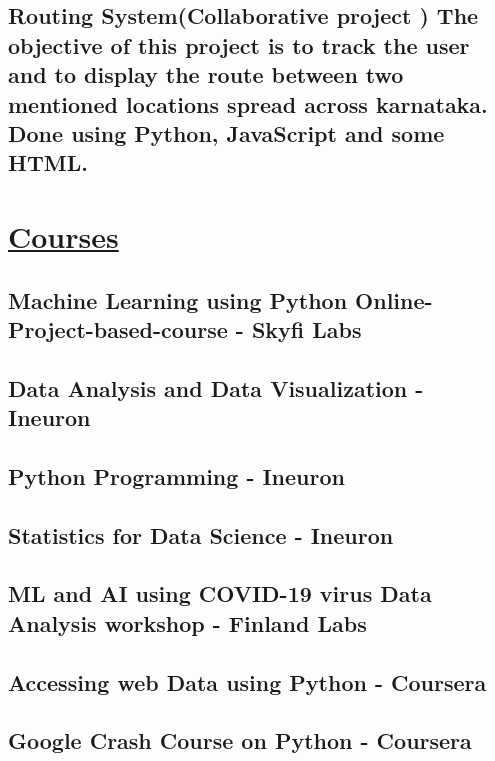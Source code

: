 \documentclass{article}
\begin{document}
    \subsection{\textbf{Routing System(Collaborative project )}
    \textmd{The objective of this project is to track the user and to display the route between two mentioned locations spread across karnataka. Done using Python, JavaScript and some HTML. } 
    }
\section{\underline{Courses}}


    \subsection{\textbf{Machine Learning using Python Online-Project-based-course }
    \textmd{- Skyfi Labs}}

    \subsection{\textbf{Data Analysis and Data Visualization}
    \textmd{- Ineuron}}

    \subsection{\textbf{Python Programming}
    \textmd{- Ineuron}}
    
    \subsection{\textbf{Statistics for Data Science}
    \textmd{- Ineuron}}

    \subsection{\textbf{ML and AI using COVID-19 virus Data Analysis workshop}
    \textmd{- Finland Labs}}

    \subsection{\textbf{Accessing web Data using Python}
    \textmd{- Coursera}}

    \subsection{\textbf{Google Crash Course on Python}
    \textmd{- Coursera}}
\end{document}
